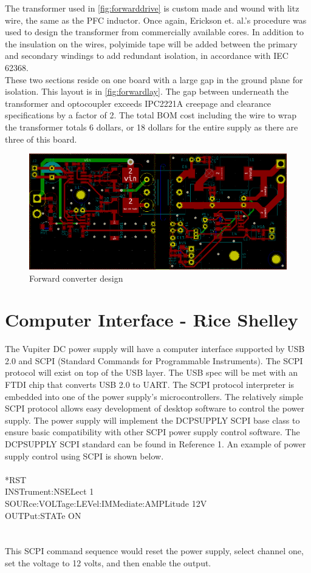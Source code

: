 \documentclass[12pt]{article}
\begin{document}
The transformer used in \autoref{fig:forwarddrive} is custom made and wound with litz wire, the same as the PFC inductor. Once again, Erickson et. al.’s\cite{2} procedure was used to design the transformer from commercially available cores. In addition to the insulation on the wires, polyimide tape will be added between the primary and secondary windings to add redundant isolation, in accordance with IEC 62368\cite{5}.\\

These two sections reside on one board with a large gap in the ground plane for isolation. This layout is in \autoref{fig:forwardlay}. The gap between underneath the transformer and optocoupler exceeds IPC2221A\cite{6} creepage and clearance specifications by a factor of 2. The total BOM cost including the wire to wrap the transformer totals 6 dollars, or 18 dollars for the entire supply as there are three of this board.
\begin{figure}[H]
    \includegraphics[width=\textwidth]{forwardlayout}
    \caption{Forward converter design}
    \label{fig:forwardlay}
\end{figure}

\section{Computer Interface - Rice Shelley}
The Vupiter DC power supply will have a computer interface supported by USB 2.0 and SCPI (Standard Commands for Programmable Instruments). The SCPI protocol will exist on top of the USB layer. The USB spec will be met with an FTDI chip that converts USB 2.0 to UART. The SCPI protocol interpreter is embedded into one of the power supply’s microcontrollers. The relatively simple SCPI protocol allows easy development of desktop software to control the power supply. The power supply will implement the DCPSUPPLY SCPI\cite{10} base class to ensure basic compatibility with other SCPI power supply control software. The DCPSUPPLY SCPI standard can be found in Reference 1. An example of power supply control using SCPI is shown below. \\
\\
*RST\\
INSTrument:NSELect 1\\
SOURce:VOLTage:LEVel:IMMediate:AMPLitude 12V\\
OUTPut:STATe ON\\
\\\\
This SCPI command sequence would reset the power supply, select channel one, set the voltage to 12 volts, and then enable the output. 
\end{document}
